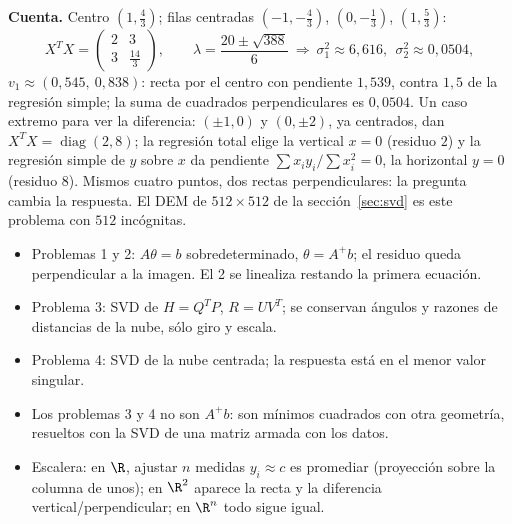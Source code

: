 \textbf{Cuenta.} Centro \((1,\tfrac43)\); filas centradas \((-1,-\tfrac43)\),
\((0,-\tfrac13)\), \((1,\tfrac53)\):
\[
  X^TX=\begin{pmatrix}2&3\\3&\tfrac{14}3\end{pmatrix},\qquad
  \lambda=\frac{20\pm\sqrt{388}}6\ \Rightarrow\ \sigma_1^2\approx6{,}616,\ \ \sigma_2^2\approx0{,}0504,
\]
\(v_1\approx(0{,}545,\ 0{,}838)\): recta por el centro con pendiente \(1{,}539\), contra
\(1{,}5\) de la regresión simple; la suma de cuadrados perpendiculares es \(0{,}0504\).
Un caso extremo para ver la diferencia: \((\pm1,0)\) y \((0,\pm2)\), ya centrados, dan
\(X^TX=\operatorname{diag}(2,8)\); la regresión total elige la vertical \(x=0\) (residuo
\(2\)) y la regresión simple de \(y\) sobre \(x\) da pendiente
\(\sum x_iy_i/\sum x_i^2=0\), la horizontal \(y=0\) (residuo \(8\)). Mismos cuatro
puntos, dos rectas perpendiculares: la pregunta cambia la respuesta. El DEM de
\(512\times512\) de la sección~\ref{sec:svd} es este problema con \(512\) incógnitas.

\begin{resultado}
\begin{itemize}
  \item Problemas 1 y 2: \(A\theta=b\) sobredeterminado, \(\theta=A^{+}b\); el residuo
  queda perpendicular a la imagen. El 2 se linealiza restando la primera ecuación.
  \item Problema 3: SVD de \(H=Q^TP\), \(R=UV^T\); se conservan ángulos y razones de
  distancias de la nube, sólo giro y escala.
  \item Problema 4: SVD de la nube centrada; la respuesta está en el menor valor singular.
  \item Los problemas 3 y 4 no son \(A^{+}b\): son mínimos cuadrados con otra geometría,
  resueltos con la SVD de una matriz armada con los datos.
  \item Escalera: en \(\R\), ajustar \(n\) medidas \(y_i\approx c\) es promediar
  (proyección sobre la columna de unos); en \(\R^2\) aparece la recta y la diferencia
  vertical/perpendicular; en \(\R^n\) todo sigue igual.
\end{itemize}
\end{resultado}
